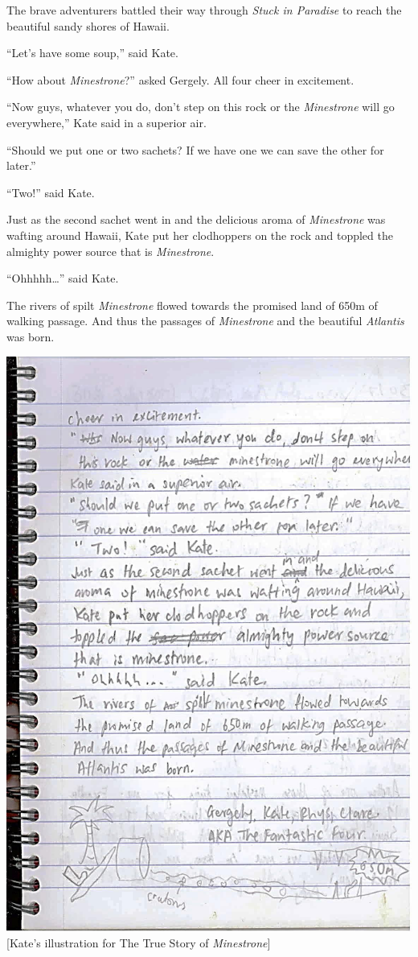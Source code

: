 The brave adventurers battled their way through \emph{Stuck in Paradise}
to reach the beautiful sandy shores of Hawaii.

``Let's have some soup,'' said Kate.

``How about \emph{Minestrone}?'' asked Gergely. All four cheer in
excitement.

``Now guys, whatever you do, don't step on this rock or the
\emph{Minestrone} will go everywhere,'' Kate said in a superior air.

``Should we put one or two sachets? If we have one we can save the other
for later.''

``Two!'' said Kate.

Just as the second sachet went in and the delicious aroma of
\emph{Minestrone} was wafting around Hawaii, Kate put her clodhoppers on
the rock and toppled the almighty power source that is
\emph{Minestrone}.

``Ohhhhh\ldots{}'' said Kate.

The rivers of spilt \emph{Minestrone} flowed towards the promised land
of 650m of walking passage. And thus the passages of \emph{Minestrone}
and the beautiful \emph{Atlantis} was born.

\includegraphics{UgLog1012/81.jpeg}\\
{[}Kate's illustration for The True Story of \emph{Minestrone}{]}

